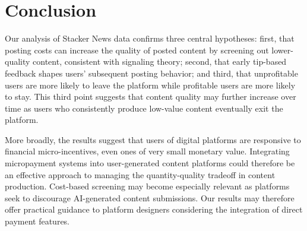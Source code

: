 \section{Conclusion} \label{sec_conclusion}

Our analysis of Stacker News data confirms three central hypotheses: first, that posting costs can increase the quality of posted content by screening out lower-quality content, consistent with signaling theory; second, that early tip-based feedback shapes users' subsequent posting behavior; and third, that unprofitable users are more likely to leave the platform while profitable users are more likely to stay. This third point suggests that content quality may further increase over time as users who consistently produce low-value content eventually exit the platform.

More broadly, the results suggest that users of digital platforms are responsive to financial micro-incentives, even ones of very small monetary value. Integrating micropayment systems into user-generated content platforms could therefore be an effective approach to managing the quantity-quality tradeoff in content production.  Cost-based screening may become especially relevant as platforms seek to discourage AI-generated content submissions. Our results may therefore offer practical guidance to platform designers considering the integration of direct payment features.


